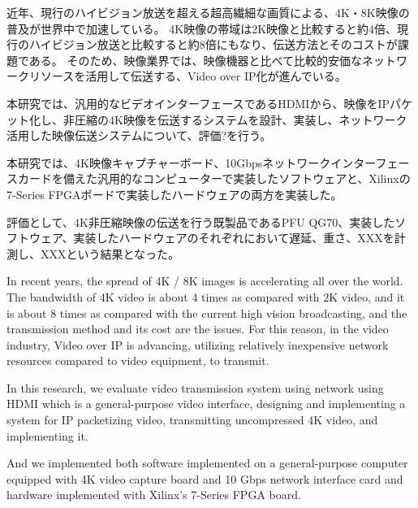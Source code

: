 
\begin{jabstract}

近年、現行のハイビジョン放送を超える超高繊細な画質による、4K・8K映像の普及が世界中で加速している。
4K映像の帯域は2K映像と比較すると約4倍、現行のハイビジョン放送と比較すると約8倍にもなり、伝送方法とそのコストが課題である。
そのため、映像業界では、映像機器と比べて比較的安価なネットワークリソースを活用して伝送する、Video over IP化が進んでいる。

本研究では、汎用的なビデオインターフェースであるHDMIから、映像をIPパケット化し、非圧縮の4K映像を伝送するシステムを設計、実装し、ネットワーク活用した映像伝送システムについて、評価?を行う。%

本研究では、4K映像キャプチャーボード、10Gbpsネットワークインターフェースカードを備えた汎用的なコンピューターで実装したソフトウェアと、Xilinxの7-Series FPGAボードで実装したハードウェアの両方を実装した。

評価として、4K非圧縮映像の伝送を行う既製品であるPFU QG70、実装したソフトウェア、実装したハードウェアのそれぞれにおいて遅延、重さ、XXXを計測し、XXXという結果となった。

\end{jabstract}


\begin{eabstract}

In recent years, the spread of 4K / 8K images is accelerating all over the world.
The bandwidth of 4K video is about 4 times as compared with 2K video, and it is about 8 times as compared with the current high vision broadcasting, and the transmission method and its cost are the issues.
For this reason, in the video industry, Video over IP is advancing, utilizing relatively inexpensive network resources compared to video equipment, to transmit.

In this research, we evaluate video transmission system using network using HDMI which is a general-purpose video interface, designing and implementing a system for IP packetizing video, transmitting uncompressed 4K video, and implementing it.

And we implemented both software implemented on a general-purpose computer equipped with 4K video capture board and 10 Gbps network interface card and hardware implemented with Xilinx's 7-Series FPGA board.

\end{eabstract}
